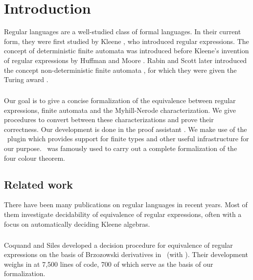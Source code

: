 \chapter{Introduction}
\label{chap:intro}

Regular languages are a well-studied class of formal languages. 
In their current form, they were first studied by Kleene \cite{KleeneNets}, who introduced regular expressions. 
The concept of deterministic finite automata was introduced before Kleene's invention of regular expressions by Huffman \cite{Huffman1954161} and Moore \cite{Moore56}. 
Rabin and Scott later introduced the concept non-deterministic finite automata \cite{Rabin:1959:FAD:1661907.1661909}, for which they were given the Turing award \cite{Ashenhurst:1987:ATA:27609}.

\paragraph{}
Our goal is to give a concise formalization of the equivalence between regular expressions, finite automata and the Myhill-Nerode characterization. 
We give procedures to convert between these characterizations and prove their correctness.
Our development is done in the proof assistant \coq.%
%
We make use of the \ssreflect\ plugin which provides support for finite types and other useful infrastructure for our purpose.
\ssreflect\ was famously used to carry out a complete formalization of the four colour theorem\cite{DBLP:conf/ascm/Gonthier07}.


\section{Related work}

There have been many publications on regular languages in recent years.
Most of them investigate decidability of equivalence of regular expressions, often with a focus on automatically deciding Kleene algebras.

\paragraph{}
Coquand and Siles developed a decision procedure for equivalence of regular expressions \cite{DBLP:conf/cpp/CoquandS11} on the basis of Brzozowski derivatives \cite{DBLP:journals/jacm/Brzozowski64} in \coq\ (with \ssreflect). Their development weighs in at 7,500 lines of code, 700 of which serve as the basis of our formalization.


